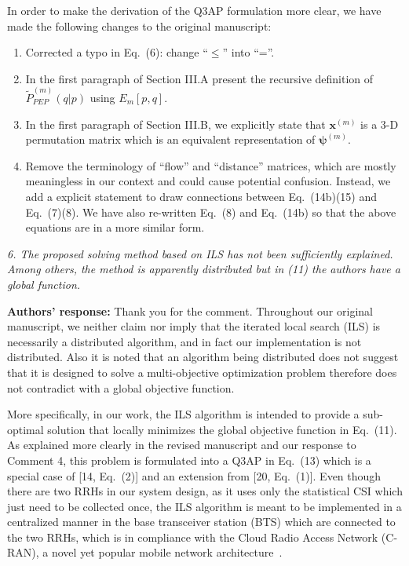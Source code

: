 \documentclass[onecolumn, 11pt, draftclsnofoot]{IEEEtran}
\begin{document}
In order to make the derivation of the Q3AP formulation more clear, we have made
the following changes to the original manuscript:
\begin{enumerate}
  \item Corrected a typo in Eq.~(6): change ``$\leq$'' into ``=''.
  \item In the first paragraph of Section III.A present the recursive definition
  of $\tilde{P}_{PEP}^{(m)}(q|p)$ using $E_m[p,q]$.
  \item In the first paragraph of Section III.B, we explicitly state that
  $\mathbf{x}^{(m)}$ is a 3-D permutation matrix which is an equivalent
  representation of $\bm{\psi}^{(m)}$.
  \item Remove the terminology of ``flow'' and ``distance'' matrices, which are
  mostly meaningless in our context and could cause potential confusion.
  Instead, we add a explicit statement to draw connections between Eq.~(14b)(15)
  and Eq.~(7)(8). We have also re-written Eq.~(8) and Eq.~(14b) so that the
  above equations are in a more similar form.
\end{enumerate}

\vspace{0.5cm}

\noindent
\emph{6. The proposed solving method based on ILS has not been sufficiently
explained. Among others, the method is apparently distributed but in (11) the
authors have a global function.}

\noindent \textbf{Authors' response:}
Thank you for the comment. Throughout our original manuscript, we neither claim
nor imply that the iterated local search (ILS) is necessarily a distributed
algorithm, and in fact our implementation is not distributed. Also it is noted
that an algorithm being distributed does not suggest that it is
designed to solve a multi-objective optimization problem therefore does not
contradict with a global objective function.

More specifically, in our work, the ILS algorithm is intended to provide a
sub-optimal solution that locally minimizes the global objective function in
Eq.~(11). As explained more clearly in the revised manuscript and our response
to Comment 4, this problem is formulated into a Q3AP in Eq.~(13) which is a
special case of [14, Eq.~(2)] and an extension from [20, Eq.~(1)]. Even though
there are two RRHs in our system design, as it uses only the statistical CSI
which just need to be collected once, the ILS algorithm is meant to be
implemented in a centralized manner in the base transceiver station (BTS) which
are connected to the two RRHs, which is in compliance with the Cloud Radio
Access Network (C-RAN), a novel yet popular mobile network
architecture~\citep[R][]{6897914}.
\end{document}
